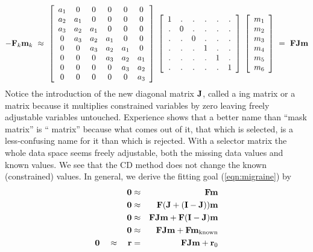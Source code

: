 \begin{equation} 
-\bold F_k \bold m_k
\ \approx \ 
\left[ 
\begin{array}{cccccc}
  a_1 & 0   & 0    & 0   & 0   & 0   \\
  a_2 & a_1 & 0    & 0   & 0   & 0   \\
  a_3 & a_2 & a_1  & 0   & 0   & 0   \\
  0   & a_3 & a_2  & a_1 & 0   & 0   \\
  0   & 0   & a_3  & a_2 & a_1 & 0   \\
  0   & 0   & 0    & a_3 & a_2 & a_1 \\
  0   & 0   & 0    & 0   & a_3 & a_2 \\
  0   & 0   & 0    & 0   & 0   & a_3 
  \end{array} \right] 
\;
\left[ 
\begin{array}{cccccc}
  1   & .   & .    & .   & .   & .   \\
  .   & 0   & .    & .   & .   & .   \\
  .   & .   & 0    & .   & .   & .   \\
  .   & .   & .    & 1   & .   & .   \\
  .   & .   & .    & .   & 1   & .   \\
  .   & .   & .    & .   & .   & 1  
  \end{array} \right] 
\;
\left[ 
\begin{array}{c}
  m_1 \\ 
  m_2 \\ 
  m_3 \\ 
  m_4 \\ 
  m_5 \\ 
  m_6
  \end{array} \right]
\ =\ \bold F \bold J \bold m
\label{eqn:migraine}
\end{equation}
Notice the introduction of the new diagonal matrix $\bold J$,
called a ing matrix or a  matrix
because it multiplies
constrained variables by zero
leaving freely adjustable variables untouched.
Experience shows that a better name than ``mask matrix'' is
`` matrix''
because what comes out of it,
that which is selected,
is a less-confusing name for it than which is rejected.
With a selector matrix the whole data space seems freely adjustable,
both the missing data values and known values.
We see that the CD method does not change the known (constrained) values.
In general, we derive the fitting goal (\ref{eqn:migraine}) by
\begin{eqnarray}
 \label{eqn:misfitgoal}
 \bold 0 &\approx& \bold F \bold m \\
 \bold 0 &\approx& \bold F( \bold J + (\bold I-\bold J) ) \bold m \\
 \bold 0 &\approx& \bold F\bold J\bold m + \bold F(\bold I-\bold J)\bold m \\
 \label{eqn:misfitgoal2}
 \bold 0 &\approx& \bold F\bold J\bold m + \bold F\bold m_{\rm known} \\
                                         \bold 0 \quad\approx\quad
 \bold r &=&       \bold F\bold J\bold m + \bold r_0
\end{eqnarray}
